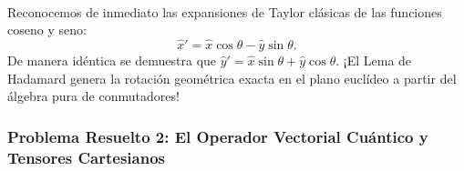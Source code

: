 \begin{ejemplobox}
\begin{align}
    \end{align}
    Reconocemos de inmediato las expansiones de Taylor clásicas de las funciones coseno y seno:
    \begin{equation}
        \boxed{\hat{x}' = \hat{x}\cos\theta - \hat{y}\sin\theta}.
    \end{equation}
    De manera idéntica se demuestra que $\hat{y}' = \hat{x}\sin\theta + \hat{y}\cos\theta$. ¡El Lema de Hadamard genera la rotación geométrica exacta en el plano euclídeo a partir del álgebra pura de conmutadores!
\end{ejemplobox}



\subsubsection[Problema 2: Operador vectorial y tensores]{Problema Resuelto 2: El Operador Vectorial Cuántico y Tensores Cartesianos}
